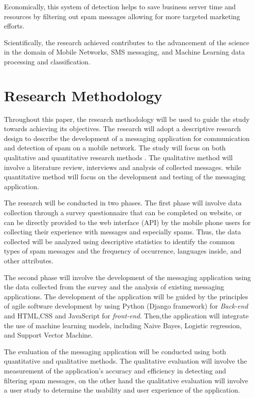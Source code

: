 \documentclass[12pt,a4paper]{report}
\begin{document}
	Economically, this system of detection helps to save business server time and resources by filtering out spam messages allowing for more targeted marketing efforts. 
	
	Scientifically, the research achieved contributes to the advancement of the science in the domain of Mobile Networks, SMS messaging, and Machine Learning data processing and classification.
	
	\section{Research Methodology}
	Throughout this paper, the research methodology will be used to guide the study towards achieving its objectives. The research will adopt a descriptive research design to describe the development of a messaging application for communication and detection of spam on a mobile network. The study will focus on both qualitative and quantitative research methods \cite{creswell2014research}. The qualitative method will involve a literature review, interviews and analysis of collected messages. while quantitative method will focus on the development and testing of the messaging application.
	
	The research will be conducted in two phases. The first phase will involve data collection through a survey questionnaire that can be completed on website, or can be directly provided to the web interface (API) by the mobile phone users for collecting their experience with messages and especially spams. Thus, the data collected will be analyzed using descriptive statistics \cite{bluman2017elementary} to identify the common types of spam messages and the frequency of occurrence, languages inside, and other attributes.  
	
	The second phase will involve the development of the messaging application using the data collected from the survey and the analysis of existing messaging applications. The development of the application will be guided by the principles of agile software development by using Python (Django framework) for \textit{Back-end} and HTML,CSS and JavaScript for \textit{front-end}. Then,the application will  integrate the use of machine learning models, including Naive Bayes, Logistic regression, and Support Vector Machine.
	
	The evaluation of the messaging application will be conducted using both quantitative and qualitative methods. The qualitative evaluation will involve the measurement of the application's accuracy and efficiency in detecting and filtering spam messages, on the other hand the qualitative evaluation will involve a user study to determine the usability and user experience of the application.
	
\end{document}
